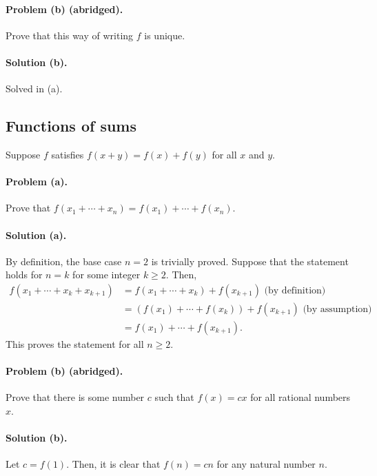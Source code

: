\documentclass{article}
\begin{document}
\paragraph{Problem (b) (abridged).} Prove that this way of writing $f$ is
unique.

\paragraph{Solution (b).} Solved in (a).

\setcounter{subsection}{15}
\subsection{Functions of sums}

Suppose $f$ satisfies $f(x + y) = f(x) + f(y)$ for all $x$ and $y$.

\paragraph{Problem (a).} Prove that $f(x_1 + \cdots + x_n) = f(x_1) + \cdots +
f(x_n)$.

\paragraph{Solution (a).} By definition, the base case $n = 2$ is trivially
proved. Suppose that the statement holds for $n = k$ for some integer $k \geq
2$. Then, \begin{align*}
  f(x_1 + \cdots + x_k + x_{k+1}) &= f(x_1 + \cdots + x_k) + f(x_{k+1})
  \text{ (by definition)} \\
    &= (f(x_1) + \cdots + f(x_k)) + f(x_{k+1}) \text{ (by assumption)} \\
    &= f(x_1) + \cdots + f(x_{k+1}).
\end{align*}
This proves the statement for all $n \geq 2$.

\paragraph{Problem (b) (abridged).} Prove that there is some number $c$ such
that $f(x) = cx$ for all rational numbers $x$.

\paragraph{Solution (b).} Let $c = f(1)$. Then, it is clear that $f(n) = cn$
for any natural number $n$.
\end{document}
